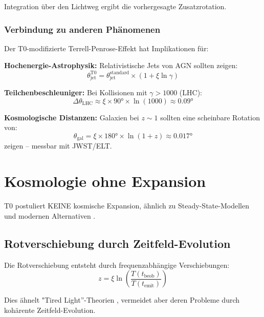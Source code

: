 	Integration über den Lichtweg ergibt die vorhergesagte Zusatzrotation.
	
	\subsubsection{Verbindung zu anderen Phänomenen}
	
	Der T0-modifizierte Terrell-Penrose-Effekt hat Implikationen für:
	
	\textbf{Hochenergie-Astrophysik:}
	Relativistische Jets von AGN sollten zeigen:
	\begin{equation}
		\theta_{\text{jet}}^{\text{T0}} = \theta_{\text{jet}}^{\text{standard}} \times (1 + \xi \ln\gamma)
	\end{equation}
	
	\textbf{Teilchenbeschleuniger:}
	Bei Kollisionen mit $\gamma > 1000$ (LHC):
	\begin{equation}
		\Delta\theta_{\text{LHC}} \approx \xi \times 90° \times \ln(1000) \approx 0.09°
	\end{equation}
	
	\textbf{Kosmologische Distanzen:}
	Galaxien bei $z \sim 1$ sollten eine scheinbare Rotation von:
	\begin{equation}
		\theta_{\text{gal}} = \xi \times 180° \times \ln(1+z) \approx 0.017°
	\end{equation}
	zeigen – messbar mit JWST/ELT.
	\section{Kosmologie ohne Expansion}
	
	T0 postuliert KEINE kosmische Expansion, ähnlich zu Steady-State-Modellen \cite{hoyle1948, bondi1948} und modernen Alternativen \cite{lopez2010, lerner2014}.
	
	\subsection{Rotverschiebung durch Zeitfeld-Evolution}
	
	Die Rotverschiebung entsteht durch frequenzabhängige Verschiebungen:
	\begin{equation}
		z = \xi \ln\left(\frac{T(t_{\text{beob}})}{T(t_{\text{emit}})}\right)
	\end{equation}
	
	Dies ähnelt "Tired Light''-Theorien \cite{zwicky1929}, vermeidet aber deren Probleme durch kohärente Zeitfeld-Evolution.
	
